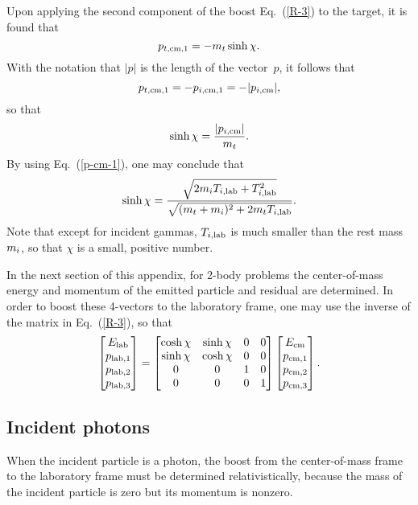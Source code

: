 {Upon applying the second component of the boost Eq.~(\ref{R-3}) to the 
target,
it is found that
$$
  p_{t,\textrm{cm},1} = - m_t  \sinh \chi.
$$
With the notation that $ | p | $
is the length of the vector~$p$, 
it follows that
$$
   p_{t,\textrm{cm},1} =  -p_{i,\textrm{cm},1} = - | p_{i,\textrm{cm}} |,
$$
so that
\begin{equation}
   \sinh \chi = \frac{|p_{i,\textrm{cm}}|}{m_t}.
 \label{lab-to-cm}
\end{equation}
By using Eq.~(\ref{p-cm-1}), one may conclude that
\begin{equation}
  \sinh \chi = \frac{\sqrt{ 2 m_i T_{i,\textrm{lab}} + T_{i,\textrm{lab}}^2}}
    {\sqrt{( m_t + m_i )^2 + 2 m_t T_{i,\textrm{lab}} }}.
  \label{lab-to-cm-2}
\end{equation}
Note that except for incident gammas, $T_{i,\textrm{lab}}$ is much smaller
than the rest mass $m_i$, so that $\chi$ is a
small, positive number.

In the next section of this appendix, for 2-body problems
the center-of-mass energy and momentum of the
emitted particle and residual are determined.  In order to boost these 4-vectors
to the laboratory frame, one may use the inverse of the matrix in
Eq.~(\ref{R-3}), so that
\begin{equation}
  \begin{bmatrix}
    E_{\text{lab}} \\
    p_{\textrm{lab},1} \\
    p_{\textrm{lab},2} \\
    p_{\textrm{lab},3}
  \end{bmatrix}
   =
    \begin{bmatrix}
     \cosh \chi & \sinh \chi & 0 & 0 \\
     \sinh \chi & \cosh \chi & 0 & 0 \\
     0  & 0 & 1 & 0 \\
     0  & 0 & 0 & 1
  \end{bmatrix}
  \begin{bmatrix}
    E_{\text{cm}} \\
    p_{\textrm{cm},1} \\
    p_{\textrm{cm},2} \\
    p_{\textrm{cm},3}
  \end{bmatrix}.
  \label{R-3-inv}
\end{equation}

\subsection{Incident photons}
\label{Sec:photon-in}
When the incident particle is a photon, the boost from the 
center-of-mass frame to the laboratory frame must be determined
relativistically, because the mass of the incident particle is zero
but its momentum is nonzero.

}

